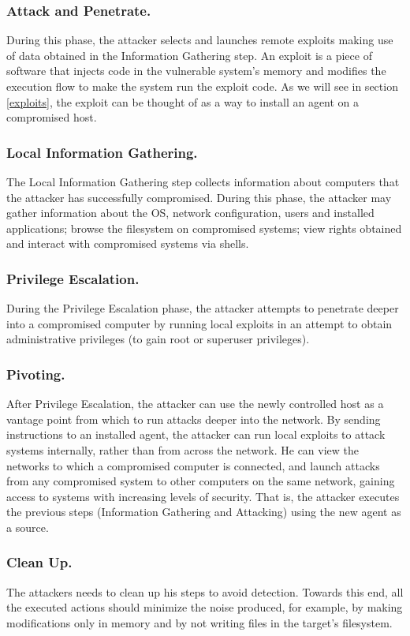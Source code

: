 \documentclass{llncs}
\begin{document}
\subsubsection{Attack and Penetrate.}
During this phase, the attacker selects and launches remote exploits
making use of data obtained in the Information Gathering step. 
An exploit is a piece of software that injects code in the vulnerable system's memory
and modifies  the execution flow to make the system run the exploit code.
As we will see in section \ref{exploits}, the exploit can be thought of
as a way to install an agent on a compromised host.


\subsubsection{Local Information Gathering.}
The Local Information Gathering step collects information about computers that the attacker
has successfully compromised. During this phase, 
the attacker may gather information about the OS, network configuration, users and installed applications;
browse the filesystem on compromised systems;
view rights obtained and interact with compromised systems via shells.

\subsubsection{Privilege Escalation.}
During the Privilege Escalation phase, the attacker attempts to penetrate deeper into a
compromised computer by running local exploits in an attempt to obtain administrative
privileges (to gain root or superuser privileges).


\subsubsection{Pivoting.}
After Privilege Escalation, the attacker can use the newly controlled host as a vantage point
from which to run attacks deeper into the network.
By sending instructions to an installed agent, the attacker
can run local exploits to attack systems internally, rather than from across the network.
He can view the networks to which a compromised computer is connected,
and launch attacks from any compromised system to other computers on the same network,
gaining access to systems with increasing levels of security.
That is, the attacker executes the previous steps (Information Gathering and Attacking)
using the new agent as a source.

\subsubsection{Clean Up.}
The attackers needs to clean up his steps to avoid detection. Towards this end, all the executed actions
should minimize the noise produced, for example, by making modifications only in memory
and by not writing files in the target's filesystem.
\end{document}
